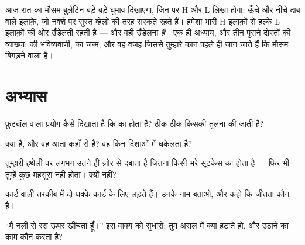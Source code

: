 \begin{remark}[मौसम के नक़्शे वाले H और L]\label{rem:g5:air-pressure-weather:map}
आज रात का मौसम बुलेटिन बड़े-बड़े घुमाव दिखाएगा, जिन पर H और L लिखा
होगा: ऊँचे और नीचे दाब वाले इलाक़े, जो नक़्शे पर सुस्त व्हेलों की तरह
सरकते रहते हैं।  हमेशा भारी H इलाक़ों से हल्के L इलाक़ों की ओर
उँडेलती रहती है --- और वही उँडेलना \emph{ है}। एक ही अध्याय, और तीन
पुराने दोस्तों की व्याख्या:  की भविष्यवाणी,  का जन्म, और वह
वजह जिससे तुम्हारे कान पहले ही जान जाते हैं कि मौसम बिगड़ने वाला है।
\end{remark}

\section{अभ्यास}

\begin{exercise}[$\star$]\label{exo:g5:air-pressure-weather:1}
फ़ुटबॉल वाला प्रयोग कैसे दिखाता है कि  का  होता है? ठीक-ठीक
किसकी तुलना की जाती है?
\end{exercise}

\begin{exercise}[$\star$]\label{exo:g5:air-pressure-weather:2}
 क्या है, और वह आता कहाँ से है? वह किन दिशाओं में धकेलता है?
\end{exercise}

\begin{exercise}[$\star$]\label{exo:g5:air-pressure-weather:3}
 तुम्हारी हथेली पर लगभग उतने ही ज़ोर से दबाता है जितना किसी
भरे सूटकेस का  होता है --- फिर भी तुम्हें कुछ महसूस नहीं होता।
क्यों नहीं?
\end{exercise}

\begin{exercise}[$\star$]\label{exo:g5:air-pressure-weather:4}
कार्ड वाली तरकीब में दो धक्के कार्ड के लिए लड़ते हैं। उनके नाम बताओ,
और कहो कि जीतता कौन है।
\end{exercise}

\begin{exercise}[$\star$]\label{exo:g5:air-pressure-weather:5}
``मैं नली से रस ऊपर खींचता हूँ।'' इस वाक्य को सुधारो: तुम असल में
क्या हटाते हो, और उठाने का काम कौन करता है?
\end{exercise}

